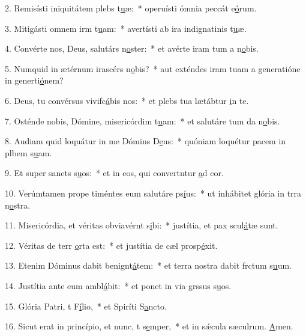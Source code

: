 2. Remisísti iniquitátem plebs t\uline{u}æ:~* operuísti ómnia peccát e\uline{ó}rum.\par 
3. Mitigásti omnem irm t\uline{u}am:~* avertísti ab ira indignatinis t\uline{u}æ.\par 
4. Convérte nos, Deus, salutárs n\uline{o}ster:~* et avérte iram tum a n\uline{o}bis.\par 
5. Numquid in ætérnum irascérs n\uline{o}bis?~* aut exténdes iram tuam a generatióne in generti\uline{ó}nem?\par 
6. Deus, tu convérsus vivifc\uline{á}bis nos:~* et plebs tua lætábtur \uline{i}n te.\par 
7. Osténde nobis, Dómine, misericórdim t\uline{u}am:~* et salutáre tum da n\uline{o}bis.\par 
8. Audiam quid loquátur in me Dómins D\uline{e}us:~* quóniam loquétur pacem in plbem s\uline{u}am.\par 
9. Et super sancts s\uline{u}os:~* et in eos, qui convertntur \uline{a}d cor.\par 
10. Verúmtamen prope timéntes eum salutáre ps\uline{í}us:~* ut inhábitet glória in trra n\uline{o}stra.\par 
11. Misericórdia, et véritas obviavérnt s\uline{i}bi:~* justítia, et pax scul\uline{á}tæ sunt.\par 
12. Véritas de terr \uline{o}rta est:~* et justítia de cæl prosp\uline{é}xit.\par 
13. Etenim Dóminus dabit benignt\uline{á}tem:~* et terra nostra dabit frctum s\uline{u}um.\par 
14. Justítia ante eum ambl\uline{á}bit:~* et ponet in via grssus s\uline{u}os.\par 
15. Glória Patri, t F\uline{í}lio,~* et Spiríti S\uline{a}ncto.\par 
16. Sicut erat in princípio, et nunc, t s\uline{e}mper,~* et in sǽcula sæculrum. \uline{A}men.\par 
